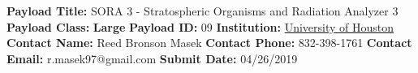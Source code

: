 \documentclass[aps,superscriptaddress,floatfix,nofootinbib,showpacs,amsmath,amssymb,altaffilletter,floatfix,onecolumn,rmp]{revtex4-1}
\begin{document}
\noindent\textbf{Payload Title:} SORA 3 - Stratospheric Organisms and Radiation Analyzer 3 \newline
\textbf{Payload Class:} \textbf{Large} \newline
\textbf{Payload ID:} \num{09} \newline
\textbf{Institution:} \underline{University of Houston} \newline
\textbf{Contact Name:} Reed Bronson Masek \newline
\textbf{Contact Phone:} 832-398-1761 \newline
\textbf{Contact Email:} r.masek97@gmail.com \newline
\textbf{Submit Date:} 04/26/2019 \newline

\setlength{\parindent}{1em}
\setdefaultleftmargin{1em}{1em}{}{}{}{}
\setcounter{page}{1}










\end{document}
